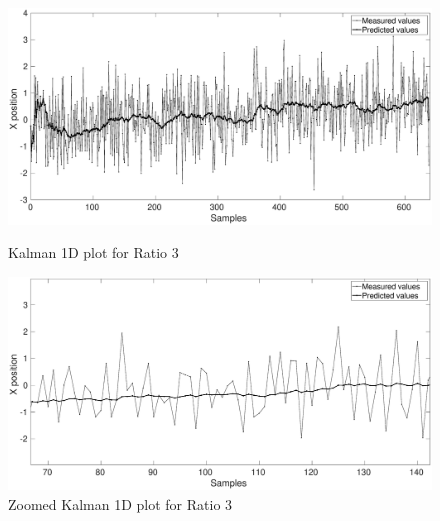 \documentclass[12pt]{article}
\begin{document}
\begin{figure}[h]
\centering
\begin{minipage}{0.5\textwidth}
\centering
	\includegraphics[width = \textwidth]{./Figures/part1Ratio3.eps}
	\caption{Kalman 1D plot for Ratio 3}
	\label{fig:kalman 1D Rat3}
\end{minipage}%
\begin{minipage}{0.5\textwidth}
\centering
	\includegraphics[width = \textwidth]{./Figures/part1Ratio3zoomed.eps}
	\caption{ Zoomed Kalman 1D plot for Ratio 3}
	\label{fig: kalman 1D Rat3 zoom}
\end{minipage}
\end{figure}
\end{document}
